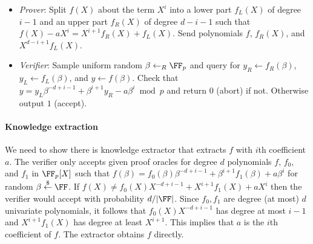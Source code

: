 \begin{itemize}

\item \emph{Prover}: Split $f(X)$ about the term $X^i$ into a lower part $f_L(X)$ of degree $i -1$ and an upper part $f_R(X)$ of degree $d - i - 1$ such that $f(X) - a X^i = X^{i+1} f_R(X) + f_L(X)$. Send polynomials $f$, $f_R(X)$, and $X^{d - i + 1}f_L(X)$. 


\item \emph{Verifier}: Sample uniform random  $\beta \leftarrow_R \FF_p$ and query for $y_R \leftarrow f_R(\beta)$, $y_L \leftarrow f_L(\beta)$, and $y \leftarrow f(\beta)$. 
Check that $y = y_L \beta^{-d + i - 1} + \beta^{i+1} y_R - a \beta^i \bmod p$ and return $0$ (abort) if not. Otherwise output $1$ (accept). 



\end{itemize}

\paragraph{Knowledge extraction} We need to show there is knowledge extractor that extracts $f$ with $i$th coefficient $a$. The verifier only accepts given proof oracles for degree $d$ polynomials $f$, $f_0$, and $f_1$ in $\FF_p[X]$ such that $f(\beta) = f_0(\beta) \beta^{-d + i - 1} + \beta^{i+1} f_1(\beta) + a\beta^i$ for random $\beta \sample \FF$. If $f(X) \neq f_0(X) X^{-d + i -1} + X^{i+1}f_1(X) + aX^i$ then the verifier would accept with probability $d/|\FF|$. Since $f_0, f_1$ are degree (at most) $d$ univariate polynomials, it follows that $f_0(X) X^{-d + i -1}$ has degree at most $i -1$ and $X^{i+1}f_1(X)$ has degree at least $X^{i+1}$. This implies that $a$ is the $i$th coefficient of $f$. The extractor obtains $f$ directly. 

